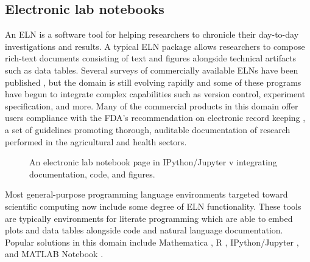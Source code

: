 \documentclass[../thesis]{subfiles}
\begin{document}
\subsection{Electronic lab notebooks}
An \gls{ELN} is a software tool for helping
researchers to chronicle their day-to-day investigations and
results. A typical \gls{ELN} package allows researchers to compose
rich-text documents consisting of text and figures alongside technical
\glspl{artifact} such as data tables. Several surveys of
commercially available ELNs have been published
\cite{Rubacha2011, Dirnagl2016}, but the domain is still evolving
rapidly and some of these programs have begun to integrate complex
capabilities such as version control, experiment specification, and
more. Many of the commercial products in this domain
offer users compliance with the FDA's recommendation on electronic
record keeping \cite{FDA}, a set of guidelines promoting thorough,
auditable documentation of research performed in the agricultural and
health sectors.

\begin{figure}
  \caption{
    An electronic lab notebook page in IPython/Jupyter v
    \cite{IPython} integrating documentation, code,
    and figures.
    \label{fig:Ipython}
  }
\end{figure}

Most general-purpose programming language environments targeted toward
scientific computing now include some degree of ELN
functionality. These tools are typically environments for literate
programming \cite{Knuth:1984:LP:473.479} which are able to embed plots
and data tables alongside code and natural language
documentation. Popular solutions in this domain include Mathematica
\cite{mathematica}, R \cite{Rlang}, IPython/Jupyter \cite{IPython},
and MATLAB Notebook \cite{MATLAB}.
\end{document}
